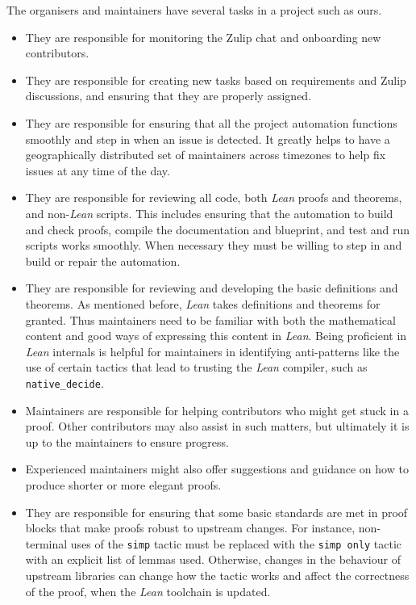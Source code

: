 \documentclass[12pt]{amsart}
\theoremstyle{definition}
\begin{document}
The organisers and maintainers have several tasks in a project such as ours.
\begin{itemize}
    \item They are responsible for monitoring the Zulip chat and onboarding new contributors.
    \item They are responsible for creating new tasks based on requirements and Zulip discussions, and ensuring that they are properly assigned.
    \item They are responsible for ensuring that all the project automation functions smoothly and step in when an issue is detected. It greatly helps to have a geographically distributed set of maintainers across timezones to help fix issues at any time of the day.
    \item They are responsible for reviewing all code, both \emph{Lean} proofs and theorems, and non-\emph{Lean} scripts. This includes ensuring that the automation to build and check proofs, compile the documentation and blueprint, and test and run scripts works smoothly. When necessary they must be willing to step in and build or repair the automation.
    \item They are responsible for reviewing and developing the basic definitions and theorems. As mentioned before, \emph{Lean} takes definitions and theorems for granted. Thus maintainers need to be familiar with both the mathematical content and good ways of expressing this content in  \emph{Lean}. Being proficient in  \emph{Lean} internals is helpful for maintainers in identifying anti-patterns like the use of certain tactics that lead to trusting the  \emph{Lean} compiler, such as \texttt{native\_decide}.
    \item Maintainers are responsible for helping contributors who might get stuck in a proof. Other contributors may also assist in such matters, but ultimately it is up to the maintainers to ensure progress.
    \item Experienced maintainers might also offer suggestions and guidance on how to produce shorter or more elegant proofs.
    \item They are responsible for ensuring that some basic standards are met in proof blocks that make proofs robust to upstream changes. For instance, non-terminal uses of the \texttt{simp} tactic must be replaced with the \texttt{simp only} tactic with an explicit list of lemmas used. Otherwise, changes in the behaviour of upstream libraries can change how the tactic works and affect the correctness of the proof, when the  \emph{Lean} toolchain is updated.

\end{itemize}
\end{document}
